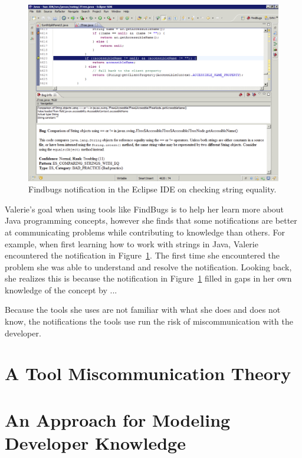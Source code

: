 \documentclass{llncs}
\begin{document}

\begin{figure} 
	\centering
	\includegraphics[width=\textwidth]{figs/eclipse-2.png}
	\caption{Findbugs notification in the Eclipse IDE on checking string equality.}
	\label{fig:eclipse2}
\end{figure}

Valerie's goal when using tools like FindBugs is to help her learn more about Java programming concepts, however she finds that some notifications are better at communicating problems while contributing to knowledge than others. For example, when first learning how to work with strings in Java, Valerie encountered the notification in Figure~\ref{fig:eclipse2}. The first time she encountered the problem she was able to understand and resolve the notification. Looking back, she realizes this is because the notification in Figure~\ref{fig:eclipse2} filled in gaps in her own knowledge of the concept by ... 

Because the tools she uses are not familiar with what she does and does not know, the notifications the tools use run the risk of miscommunication with the developer. 


\section{A Tool Miscommunication Theory}

\section{An Approach for Modeling Developer Knowledge}
\end{document}
